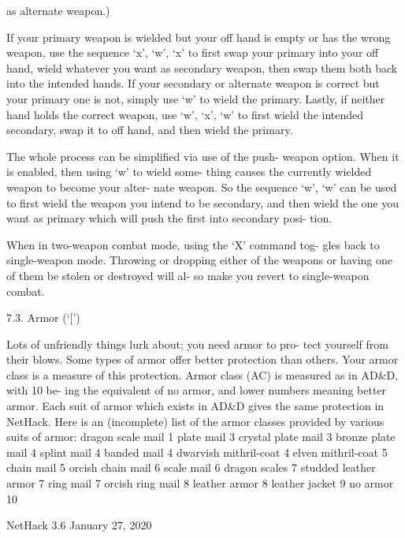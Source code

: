 \documentclass[11pt]{article}
\begin{document}
as alternate weapon.)

   If your primary weapon is wielded but your off hand is empty
or has the wrong weapon, use the sequence `x', `w', `x' to first
swap your primary into your off hand, wield whatever you want as
secondary weapon, then swap them both back into the intended
hands. If your secondary or alternate weapon is correct but your
primary one is not, simply use `w' to wield the primary. Lastly,
if neither hand holds the correct weapon, use `w', `x', `w' to
first wield the intended secondary, swap it to off hand, and then
wield the primary.

   The whole process can be simplified via use of the push-
weapon option. When it is enabled, then using `w' to wield some-
thing causes the currently wielded weapon to become your alter-
nate weapon. So the sequence `w', `w' can be used to first wield
the weapon you intend to be secondary, and then wield the one you
want as primary which will push the first into secondary posi-
tion.

   When in two-weapon combat mode, using the `X' command tog-
gles back to single-weapon mode. Throwing or dropping either of
the weapons or having one of them be stolen or destroyed will al-
so make you revert to single-weapon combat.

7.3. Armor (`[')

   Lots of unfriendly things lurk about; you need armor to pro-
tect yourself from their blows. Some types of armor offer better
protection than others.  Your armor class is a measure of this
protection. Armor class (AC) is measured as in AD\&D, with 10 be-
ing the equivalent of no armor, and lower numbers meaning better
armor. Each suit of armor which exists in AD\&D gives the same
protection in NetHack. Here is an (incomplete) list of the armor
classes provided by various suits of armor:
	  dragon scale mail     1
	  plate mail        3
	  crystal plate mail    3
	  bronze plate mail     4
	  splint mail        4
	  banded mail        4
	  dwarvish mithril-coat   4
	  elven mithril-coat    5
	  chain mail        5
	  orcish chain mail     6
	  scale mail        6
	  dragon scales       7
	  studded leather armor   7
	  ring mail         7
	  orcish ring mail     8
	  leather armor       8
	  leather jacket      9
	  no armor         10



NetHack 3.6                   January 27, 2020
\end{document}
